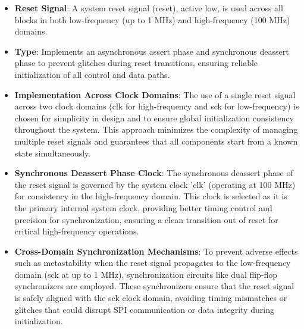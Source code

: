 \begin{itemize}[nosep]
    \item \textbf{Reset Signal}: A system reset signal (reset), active low, is used across all blocks in both low-frequency (up to 1 MHz) and high-frequency (100 MHz) domains.
    \item \textbf{Type}: Implements an asynchronous assert phase and synchronous deassert phase to prevent glitches during reset transitions, ensuring reliable initialization of all control and data paths.
    \item \textbf{Implementation Across Clock Domains}: The use of a single reset signal across two clock domains (clk for high-frequency and sck for low-frequency) is chosen for simplicity in design and to ensure global initialization consistency throughout the system. This approach minimizes the complexity of managing multiple reset signals and guarantees that all components start from a known state simultaneously.
    \item \textbf{Synchronous Deassert Phase Clock}: The synchronous deassert phase of the reset signal is governed by the system clock 'clk' (operating at 100 MHz) for consistency in the high-frequency domain. This clock is selected as it is the primary internal system clock, providing better timing control and precision for synchronization, ensuring a clean transition out of reset for critical high-frequency operations.
    \item \textbf{Cross-Domain Synchronization Mechanisms}: To prevent adverse effects such as metastability when the reset signal propagates to the low-frequency domain (sck at up to 1 MHz), synchronization circuits like dual flip-flop synchronizers are employed. These synchronizers ensure that the reset signal is safely aligned with the sck clock domain, avoiding timing mismatches or glitches that could disrupt SPI communication or data integrity during initialization.
\end{itemize}


    
